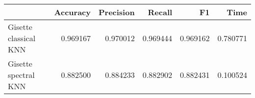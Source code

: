 \begin{tabular}{lrrrrr}
\toprule
{} &  Accuracy &  Precision &    Recall &        F1 &      Time \\
\midrule
Gisette classical KNN &  0.969167 &   0.970012 &  0.969444 &  0.969162 &  0.780771 \\
Gisette spectral KNN  &  0.882500 &   0.884233 &  0.882902 &  0.882431 &  0.100524 \\
\bottomrule
\end{tabular}
